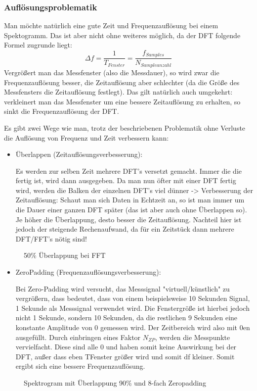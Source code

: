\documentclass[12pt,a4paper]{article}
\begin{document}
\subsubsection{Auflösungsproblematik} \label{fftchap}
Man möchte natürlich eine gute Zeit und Frequenzauflösung bei einem Spektogramm. Das ist aber nicht ohne weiteres möglich, da der DFT folgende Formel zugrunde liegt:
\[
\Delta f = \frac{1}{T_{Fenster}} = \frac{f_{Samples}}{N_{Sampleanzahl}}
\]
Vergrößert man das Messfenster (also die Messdauer), so wird zwar die Frequenzauflösung besser, die Zeitauflösung aber schlechter (da die Größe des Messfensters die Zeitauflösung festlegt). Das gilt natürlich auch umgekehrt: verkleinert man das Messfenster um eine bessere Zeitauflösung zu erhalten, so sinkt die Frequenzauflösung der DFT.


Es gibt zwei Wege wie man, trotz der beschriebenen Problematik ohne Verluste die Auflösung von Frequenz und Zeit verbessern kann:
\begin{itemize}
\item Überlappen (Zeitauflösungsverbesserung):

 Es werden zur selben Zeit mehrere DFT’s versetzt gemacht. Immer die die fertig ist, wird dann ausgegeben. Da man nun öfter mit einer DFT fertig wird, werden die Balken der einzelnen DFT’s viel dünner -> Verbesserung der Zeitauflösung: 
Schaut man sich Daten in Echtzeit an, so ist man immer um die Dauer einer ganzen DFT später (das ist aber auch ohne Überlappen so).  Je höher die Überlappung, desto besser die Zeitauflösung.
Nachteil hier ist jedoch der steigende Rechenaufwand, da für ein Zeitstück dann mehrere DFT/FFT’s nötig sind!
\end{itemize}
\begin{figure} [h]%
	\centering
	\label{fig:overlap} 
	\caption{50\% Überlappung bei FFT}
\end{figure}
\begin{itemize}
\item ZeroPadding (Frequenzauflösungsverbesserung):


Bei Zero-Padding wird versucht, das Messsignal "virtuell/künstlich" zu vergrößern, dass bedeutet, dass von einem beispielsweise 10 Sekunden Signal, 1 Sekunde als Messsignal verwendet wird. Die Fenstergröße ist hierbei jedoch nicht 1 Sekunde, sondern 10 Sekunden, da die restlichen 9 Sekunden eine konstante Amplitude von 0 gemessen wird. Der Zeitbereich wird also mit 0en ausgefüllt. Durch einbringen eines Faktor $N_{ZP}$, werden die Messpunkte vervielfacht.
Diese sind alle 0 und haben somit keine Auswirkung bei der DFT, außer dass eben TFenster größer wird und somit df kleiner. Somit ergibt sich eine bessere Frequenzauflösung.
\end{itemize}
\begin{figure} [h]%
	\centering
	\label{fig:spekwithoverlapandzeropadding} 
	\caption{Spektrogram mit Überlappung 90\% und 8-fach Zeropadding}
\end{figure}
\newpage
\end{document}
